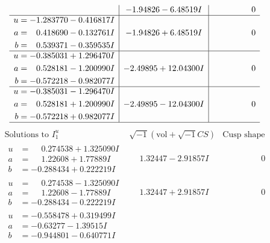 \documentclass[1p]{elsarticle_modified}
\theoremstyle{definition}
\newcommand{\I}{\sqrt{-1}}
\begin{document}
$$\begin{array}{c|c|c}
 & -1.94826 - 6.48519 I & \phantom{-0.000000 } 0 \\ \hline\begin{aligned}
u &= -1.283770 - 0.416817 I \\
a &= \phantom{-}0.418690 - 0.132761 I \\
b &= \phantom{-}0.539371 - 0.359535 I\end{aligned}
 & -1.94826 + 6.48519 I & \phantom{-0.000000 } 0 \\ \hline\begin{aligned}
u &= -0.385031 + 1.296470 I \\
a &= \phantom{-}0.528181 - 1.200990 I \\
b &= -0.572218 - 0.982077 I\end{aligned}
 & -2.49895 + 12.04300 I & \phantom{-0.000000 } 0 \\ \hline\begin{aligned}
u &= -0.385031 - 1.296470 I \\
a &= \phantom{-}0.528181 + 1.200990 I \\
b &= -0.572218 + 0.982077 I\end{aligned}
 & -2.49895 - 12.04300 I & \phantom{-0.000000 } 0\\
 \hline 
 \end{array}$$\newpage$$\begin{array}{c|c|c}  
\text{Solutions to }I^u_{1}& \I (\text{vol} + \sqrt{-1}CS) & \text{Cusp shape}\\
 \hline 
\begin{aligned}
u &= \phantom{-}0.274538 + 1.325090 I \\
a &= \phantom{-}1.22608 + 1.77889 I \\
b &= -0.288434 + 0.222219 I\end{aligned}
 & \phantom{-}1.32447 - 2.91857 I & \phantom{-0.000000 } 0 \\ \hline\begin{aligned}
u &= \phantom{-}0.274538 - 1.325090 I \\
a &= \phantom{-}1.22608 - 1.77889 I \\
b &= -0.288434 - 0.222219 I\end{aligned}
 & \phantom{-}1.32447 + 2.91857 I & \phantom{-0.000000 } 0 \\ \hline\begin{aligned}
u &= -0.558478 + 0.319499 I \\
a &= -0.63277 - 1.39515 I \\
b &= -0.944801 - 0.640771 I\end{aligned}

\end{array}$$
\end{document}
